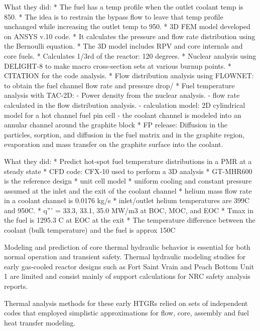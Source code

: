 What they did:
* The fuel has a temp profile when the outlet coolant temp is 850.
* The idea is to restrain the bypass flow to leave that temp profile unchanged while increasing the outlet temp to 950.
* 3D FEM model developed on ANSYS v.10 code.
* It calculates the pressure and flow rate distribution using the Bernoulli equation.
* The 3D model includes RPV and core internals and core fuels.
* Calculates 1/3rd of the reactor: 120 degrees.
* Nuclear analysis using DELIGHT-8 to make macro cross-section sets at various burnup points.
* CITATION for the code analysis.
* Flow distribution analysis using FLOWNET: to obtain the fuel channel flow rate and pressure drop/
* Fuel temperature analysis with TAC-2D:
	- Power density from the nuclear analysis.
	- flow rate calculated in the flow distribution analysis.
	- calculation model: 2D cylindrical model for a hot channel fuel pin cell
	- the coolant channel is modeled into an annular channel around the graphite block
* FP release: Diffusion in the particles, sorption, and diffusion in the fuel matrix and in the graphite region, evaporation and mass transfer on the graphite surface into the coolant.

What they did:
* Predict hot-spot fuel temperature distributions in a PMR at a steady state
* CFD code: CFX-10 used to perform a 3D analysis
* GT-MHR600 is the reference design
* unit cell model
* uniform cooling and constant pressure assumed at the inlet and the exit of the coolant channel
* helium mass flow rate in a coolant channel is 0.0176 kg/s
* inlet/outlet helium temperatures are 399C and 950C.
* q''' = 33.3, 33.1, 35.0 MW/m3 at BOC, MOC, and EOC
* Tmax in the fuel is 1295.3 C at EOC at the exit
* The temperature difference between the coolant (bulk temperature) and the fuel is approx 150C



Modeling and prediction of core thermal hydraulic behavior is essential for both normal operation and transient safety.
Thermal hydraulic modeling studies for early gas-cooled reactor designs such as Fort Saint Vrain and Peach Bottom Unit 1 are limited and consist mainly of support calculations for NRC safety analysis reports.

Thermal analysis methods for these early HTGRs relied on sets of independent codes that employed simplistic approximations for flow, core, assembly and fuel heat transfer modeling.

